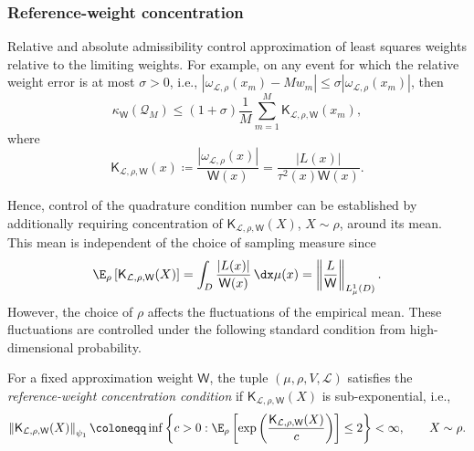 \documentclass[10pt,dvipsnames]{amsart}
\begin{document}
\subsubsection{Reference-weight concentration}
\label{ssec:reference-weight-concentration}

Relative and absolute admissibility control approximation of least squares weights relative to the limiting
weights. For example, on any event for which the relative weight error is at most
\(\sigma>0\), i.e., $|\omega_{\mathcal L, \rho}(x_m) - M w_m| \leq \sigma |\omega_{\mathcal L,\rho}(x_m)|$, then
\begin{equation}
\label{eq:condition-number-reference-weight-bound}
    \kappa_{\mathsf W}(\mathcal Q_M)
    \leq
    (1+\sigma)\frac{1}{M}
    \sum_{m=1}^M
    \mathsf K_{\mathcal L,\rho,\mathsf W}(x_m),
\end{equation}
where
\begin{equation}
\label{eq:weighted-reference-magnitude}
    \mathsf K_{\mathcal L,\rho,\mathsf W}(x)
    \coloneqq
    \frac{|\omega_{\mathcal L,\rho}(x)|}{\mathsf W(x)}
    =
    \frac{|L(x)|}{\tau^2(x)\mathsf W(x)}.
\end{equation}

Hence, control of the quadrature condition number can be established by additionally 
requiring concentration of \(\mathsf K_{\mathcal L,\rho,\mathsf W}(X)\), \(X\sim\rho\), around its mean.
This mean is independent of the choice of sampling measure since
\begin{equation}
\label{eq:reference-weight-mean}
    \E_\rho\left[
        \mathsf K_{\mathcal L,\rho,\mathsf W}(X)
    \right]
    =
    \int_D
    \frac{|L(x)|}{\mathsf W(x)}
    \,\dx\mu(x)
    =
    \left\|
        \frac{L}{\mathsf W}
    \right\|_{L^1_\mu(D)}.
\end{equation}
However, the choice of \(\rho\) affects the fluctuations of the empirical mean. These fluctuations are controlled under the following standard condition from high-dimensional probability.

\begin{definition}
\label{ass:reference-weight-concentration}
For a fixed approximation weight \(\mathsf W\), the tuple
\((\mu,\rho,V,\mathcal L)\) satisfies the
\emph{reference-weight concentration condition} if
\(\mathsf K_{\mathcal L,\rho,\mathsf W}(X)\) is sub-exponential, i.e.,
\begin{equation}
\label{eq:reference-weight-concentration}
    \left\|
        \mathsf K_{\mathcal L,\rho,\mathsf W}(X)
    \right\|_{\psi_1}
    \coloneqq
    \inf\left\{
        c>0:
        \E_\rho\left[
            \exp\left(
                \frac{
                    \mathsf K_{\mathcal L,\rho,\mathsf W}(X)
                }{c}
            \right)
        \right]
        \leq2
    \right\}
    <\infty,
    \qquad X\sim\rho.
\end{equation}
\end{definition}
\end{document}
